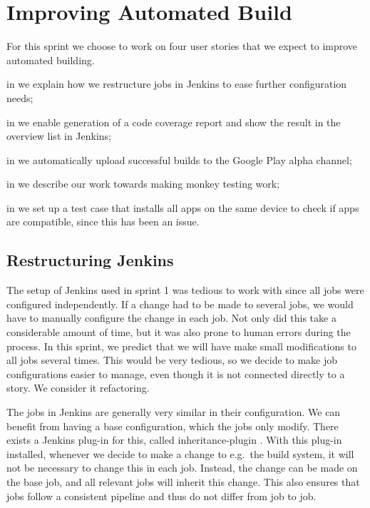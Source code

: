 \chapter{Improving Automated Build}
For this sprint we choose to work on four user stories that we expect to improve automated building.

\begin{chapterorganization}
  \item in  we explain how we restructure jobs in Jenkins to ease further configuration needs;
  \item in  we enable generation of a code coverage report and show the result in the overview list in Jenkins;
  \item in  we automatically upload successful builds to the Google Play alpha channel;
  \item in  we describe our work towards making monkey testing work;
  \item in  we set up a test case that installs all apps on the same device to check if apps are compatible, since this has been an issue.
\end{chapterorganization}

\section{Restructuring Jenkins}\label{sec:jenkins_restruct}
The setup of Jenkins used in sprint 1 was tedious to work with since all jobs were configured independently. If a change had to be made to several jobs, we would have to manually configure the change in each job. Not only did this take a considerable amount of time, but it was also prone to human errors during the process. In this sprint, we predict that we will have make small modifications to all jobs several times. This would be very tedious, so we decide to make job configurations easier to manage, even though it is not connected directly to a story. We consider it refactoring.

The jobs in Jenkins are generally very similar in their configuration. We can benefit from having a base configuration, which the jobs only modify. There exists a Jenkins plug-in for this, called inheritance-plugin \parencite{jenkins-inheritance}. With this plug-in installed, whenever we decide to make a change to e.g.\ the build system, it will not be necessary to change this in each job. Instead, the change can be made on the base job, and all relevant jobs will inherit this change. This also ensures that jobs follow a consistent pipeline and thus do not differ from job to job.

